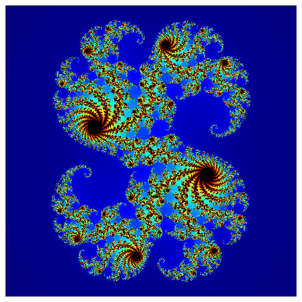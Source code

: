 \begin{figure}[H]
\begin{minipage}[H]{0.42\textwidth}
            \includegraphics[width=\textwidth]{images/julia(c=(0.285000,0.013000xi)).png}
        \end{minipage}
    \end{figure}
